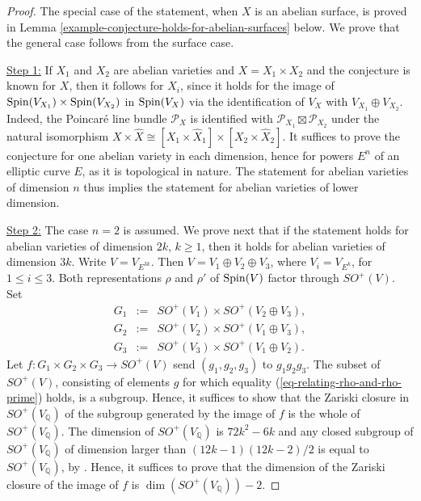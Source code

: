\documentclass[12pt]{amsart}
\numberwithin{equation}{subsection}
\theoremstyle{plain}
\theoremstyle{definition}
\newcommand{\QQ}{{\mathbb Q}}
\renewcommand{\P}{{\mathcal P}}
\newcommand{\Spin}{{\rm Spin}}
\begin{document}
\begin{proof} 
The special case of the statement, when $X$ is an abelian surface, is proved in 
Lemma \ref{example-conjecture-holds-for-abelian-surfaces} below. We prove that the general case follows from the surface case.

\underline{Step 1:}
If $X_1$ and $X_2$ are abelian varieties and $X=X_1\times X_2$ and the conjecture is known for $X$, then it follows for $X_i$,
since it holds for the image of $\Spin(V_{X_1})\times \Spin(V_{X_2})$ in $\Spin(V_X)$ via the identification of $V_X$ with $V_{X_1}\oplus V_{X_2}$. Indeed, the Poincar\'{e} line bundle $\P_X$ is identified with $\P_{X_1}\boxtimes\P_{X_2}$ under the natural isomorphism $X\times \hat{X}\cong [X_1\times\hat{X}_1]\times[X_2\times\hat{X}_2]$. It suffices to prove the conjecture for one abelian variety in each dimension, hence for powers $E^n$ of an elliptic curve $E$, as it is topological in nature. 
The statement for abelian varieties of dimension $n$ thus implies the statement for abelian varieties of lower dimension. 

\underline{Step 2:}
The case $n=2$ is assumed. 
We prove next that if the statement holds  for abelian varieties of dimension $2k$, $k\geq 1$, then it holds  for abelian varieties of dimension $3k$.
Write $V=V_{E^{3k}}$. Then $V=V_1\oplus V_2\oplus V_3$, where  $V_i=V_{E^k}$, for $1\leq i\leq 3$. Both representations $\rho$ and $\rho'$ of $\Spin(V)$ factor through $SO^+(V)$.
Set
\begin{eqnarray*}
G_1&:=&SO^+(V_1)\times SO^+(V_2\oplus V_3),
\\
G_2&:=&SO^+(V_2)\times SO^+(V_1\oplus V_3),
\\
G_3&:=&SO^+(V_3)\times SO^+(V_1\oplus V_2).
\end{eqnarray*} 
Let $f:G_1\times G_2\times G_3\rightarrow SO^+(V)$ send $(g_1,g_2,g_3)$ to $g_1g_2g_3$.
The subset of $SO^+(V)$, consisting of elements $g$ for which equality (\ref{eq-relating-rho-and-rho-prime}) holds, is a subgroup. Hence,
it suffices to show that the Zariski closure in $SO^+(V_\QQ)$ of the subgroup generated by the image of $f$ is the whole of 
$SO^+(V_\QQ)$. The dimension of $SO^+(V_\QQ)$ is $72k^2-6k$ and any closed subgroup of 
$SO^+(V_\QQ)$ of dimension larger than $(12k-1)(12k-2)/2$ is equal to $SO^+(V_\QQ)$, by
\cite[Theorem B]{obata}. Hence, it suffices to prove that the dimension of the Zariski closure of the image of $f$ is 
$\dim(SO^+(V_\QQ))-2$.


\end{proof}
\end{document}

